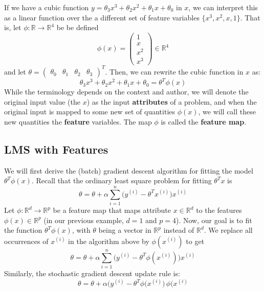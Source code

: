 \documentclass[a4paper, 12pt]{report}
\theoremstyle{remark}
\theoremstyle{definition}
\begin{document}
If we have a cubic function $y = \theta_3 x^3 + \theta_2 x^2 + \theta_1 x + \theta_0$ in $x$, we can interpret this as a linear function over the a different set of feature variables $\{x^3, x^2, x, 1\}$. That is, let $\phi: \mathbb{R} \longrightarrow \mathbb{R}^4$ be be defined
\[\phi(x) = \begin{pmatrix}
1 \\ x \\ x^2 \\ x^3
\end{pmatrix} \in \mathbb{R}^4\]
and let $\theta = \begin{pmatrix} \theta_0 & \theta_1 & \theta_2 & \theta_3 \end{pmatrix}^T$. Then, we can rewrite the cubic function in $x$ as: 
\[\theta_3 x^3 + \theta_2 x^2 + \theta_1 x + \theta_0 = \theta^T \phi(x)\]
While the terminology depends on the context and author, we will denote the original input value (the $x$) as the input \textbf{attributes} of a problem, and when the original input is mapped to some new set of quantities $\phi(x)$, we will call these new quantities the \textbf{feature} variables. The map $\phi$ is called the \textbf{feature map}. 

\subsection{LMS with Features}
We will first derive the (batch) gradient descent algorithm for fitting the model $\theta^T \phi(x)$. Recall that the ordinary least square problem for fitting $\theta^T x$ is 
\[\theta = \theta + \alpha \sum_{i=1}^n \big( y^{(i)} -  \theta^T x^{(i)} \big) x^{(i)}\]
Let $\phi: \mathbb{R}^d \longrightarrow \mathbb{R}^p$ be a feature map that maps attribute $x \in \mathbb{R}^d$ to the features $\phi(x) \in \mathbb{R}^p$ (in our previous example, $d=1$ and $p=4$). Now, our goal is to fit the function $\theta^T \phi(x)$, with $\theta$ being a vector in $\mathbb{R}^p$ instead of $\mathbb{R}^d$. We replace all occurrences of $x^{(i)}$ in the algorithm above by $\phi(x^{(i)})$ to get
\[\theta = \theta + \alpha \sum_{i=1}^n \big( y^{(i)} -  \theta^T \phi(x^{(i)}) \big) x^{(i)}\]
Similarly, the stochastic gradient descent update rule is: 
\[\theta = \theta + \alpha \big( y^{(i)} - \theta^T \phi(x^{(i)} \big) \, \phi(x^{(i)}\]
\end{document}
